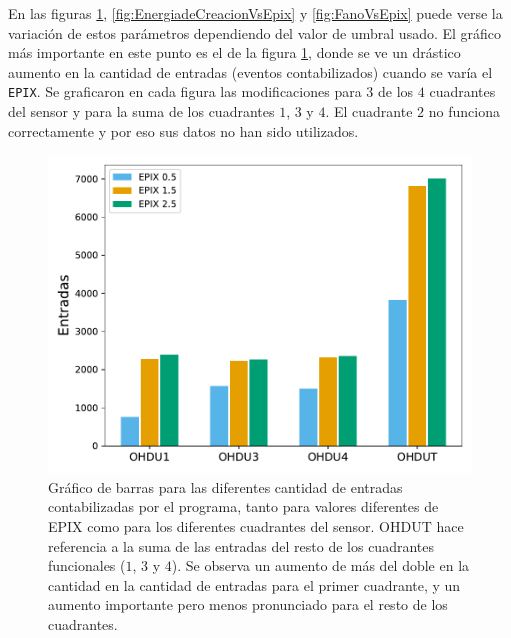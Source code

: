 \indent En las figuras \ref{fig:EntradasVsEpix}, \ref{fig:EnergiadeCreacionVsEpix} y \ref{fig:FanoVsEpix}  puede verse la variación de estos parámetros dependiendo del valor de umbral usado. El gráfico más importante en este punto es el de la figura \ref{fig:EntradasVsEpix}, donde se ve un drástico aumento en la cantidad de entradas (eventos contabilizados) cuando se varía el \verb|EPIX|. Se graficaron en cada figura las modificaciones para $3$ de los $4$ cuadrantes del sensor y para la suma de los cuadrantes $1$, $3$ y $4$. El cuadrante $2$ no funciona correctamente y por eso sus datos no han sido utilizados.
\begin{figure}[h]
    \centering
    \includegraphics[scale=0.5]{Figs/Entradas_vs_Epix.pdf}
    \caption{\footnotesize{Gráfico de barras para las diferentes cantidad de entradas contabilizadas por el programa, tanto para valores diferentes de EPIX como para los diferentes cuadrantes del sensor. OHDUT hace referencia a la suma de las entradas del resto de los cuadrantes funcionales ($1$, $3$ y $4$). Se observa un aumento de más del doble en la cantidad en la cantidad de entradas para el primer cuadrante, y un aumento importante pero menos pronunciado para el resto de los cuadrantes.}}
    \label{fig:EntradasVsEpix}
\end{figure}
